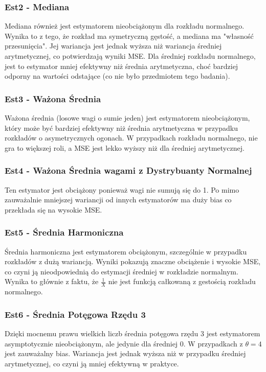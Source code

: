 \documentclass[a4paper,12pt]{article}
\begin{document}
\subsubsection{Est2 - Mediana}
Mediana również jest estymatorem nieobciążonym dla rozkładu normalnego. 
Wynika to z tego, że rozkład ma symetryczną gęstość, a mediana ma "własność przesunięcia".
Jej wariancja jest jednak wyższa niż wariancja średniej arytmetycznej,
co potwierdzają wyniki MSE. 
Dla średniej rozkładu normalnego, jest to estymator mniej efektywny niż średnia arytmetyczna, 
choć bardziej odporny na wartości odstające (co nie było przedmiotem tego badania).

\subsubsection{Est3 - Ważona Średnia}
Ważona średnia (losowe wagi o sumie jeden) jest estymatorem nieobciążonym, który może być bardziej efektywny niż średnia arytmetyczna w przypadku rozkładów o asymetrycznych ogonach.
W przypadkach rozkładu normalnego, nie gra to większej roli, a MSE jest lekko wyższy niż dla średniej arytmetycznej.

\subsubsection{Est4 - Ważona Średnia wagami z Dystrybuanty Normalnej}
Ten estymator jest obciążony ponieważ wagi nie sumują się do 1. Po mimo zauważalnie mniejszej wariancji 
od innych estymatorów ma duży bias co przekłada się na wysokie MSE.

\subsubsection{Est5 - Średnia Harmoniczna}
Średnia harmoniczna jest estymatorem obciążonym, szczególnie w przypadku rozkładów z dużą wariancją.
Wyniki pokazują znaczne obciążenie i wysokie MSE, co czyni ją nieodpowiednią do estymacji średniej w rozkładzie normalnym.
Wynika to głównie z faktu, że $\frac{1}{X}$ nie jest funkcją całkowaną z gestością rozkładu normalnego.

\subsubsection{Est6 - Średnia Potęgowa Rzędu 3}
Dzięki mocnemu prawu wielkich liczb średnia potęgowa rzędu 3 jest estymatorem asymptotycznie nieobciążonym, ale jedynie dla średniej 0.
W przypadkach z $\theta = 4$ jest zauważalny bias.
Wariancja jest jednak wyższa niż w przypadku średniej arytmetycznej, co czyni ją mniej efektywną w praktyce.
\end{document}
